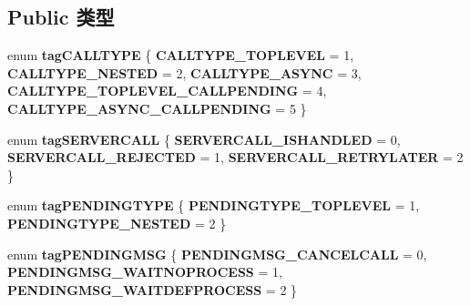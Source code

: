 \subsection*{Public 类型}
\begin{DoxyCompactItemize}
\item 
\mbox{\label{interface_i_message_filter_a4e79377b4f47822119c67ba342b14741}} 
enum {\bfseries tag\+C\+A\+L\+L\+T\+Y\+PE} \{ \newline
{\bfseries C\+A\+L\+L\+T\+Y\+P\+E\+\_\+\+T\+O\+P\+L\+E\+V\+EL} = 1, 
{\bfseries C\+A\+L\+L\+T\+Y\+P\+E\+\_\+\+N\+E\+S\+T\+ED} = 2, 
{\bfseries C\+A\+L\+L\+T\+Y\+P\+E\+\_\+\+A\+S\+Y\+NC} = 3, 
{\bfseries C\+A\+L\+L\+T\+Y\+P\+E\+\_\+\+T\+O\+P\+L\+E\+V\+E\+L\+\_\+\+C\+A\+L\+L\+P\+E\+N\+D\+I\+NG} = 4, 
\newline
{\bfseries C\+A\+L\+L\+T\+Y\+P\+E\+\_\+\+A\+S\+Y\+N\+C\+\_\+\+C\+A\+L\+L\+P\+E\+N\+D\+I\+NG} = 5
 \}
\item 
\mbox{\label{interface_i_message_filter_a3bbddf1833fbf9afef38162c10b331de}} 
enum {\bfseries tag\+S\+E\+R\+V\+E\+R\+C\+A\+LL} \{ {\bfseries S\+E\+R\+V\+E\+R\+C\+A\+L\+L\+\_\+\+I\+S\+H\+A\+N\+D\+L\+ED} = 0, 
{\bfseries S\+E\+R\+V\+E\+R\+C\+A\+L\+L\+\_\+\+R\+E\+J\+E\+C\+T\+ED} = 1, 
{\bfseries S\+E\+R\+V\+E\+R\+C\+A\+L\+L\+\_\+\+R\+E\+T\+R\+Y\+L\+A\+T\+ER} = 2
 \}
\item 
\mbox{\label{interface_i_message_filter_a58ac2d17b2b998a8bbfb90fe7f8b0723}} 
enum {\bfseries tag\+P\+E\+N\+D\+I\+N\+G\+T\+Y\+PE} \{ {\bfseries P\+E\+N\+D\+I\+N\+G\+T\+Y\+P\+E\+\_\+\+T\+O\+P\+L\+E\+V\+EL} = 1, 
{\bfseries P\+E\+N\+D\+I\+N\+G\+T\+Y\+P\+E\+\_\+\+N\+E\+S\+T\+ED} = 2
 \}
\item 
\mbox{\label{interface_i_message_filter_aa5bd0970ec54d1819672e4581e738f94}} 
enum {\bfseries tag\+P\+E\+N\+D\+I\+N\+G\+M\+SG} \{ {\bfseries P\+E\+N\+D\+I\+N\+G\+M\+S\+G\+\_\+\+C\+A\+N\+C\+E\+L\+C\+A\+LL} = 0, 
{\bfseries P\+E\+N\+D\+I\+N\+G\+M\+S\+G\+\_\+\+W\+A\+I\+T\+N\+O\+P\+R\+O\+C\+E\+SS} = 1, 
{\bfseries P\+E\+N\+D\+I\+N\+G\+M\+S\+G\+\_\+\+W\+A\+I\+T\+D\+E\+F\+P\+R\+O\+C\+E\+SS} = 2
 \}
\item 
\mbox{\label{interface_i_message_filter_aee180b03b3ad6f9c1bb9ce451d462524}} 

\end{DoxyCompactItemize}
